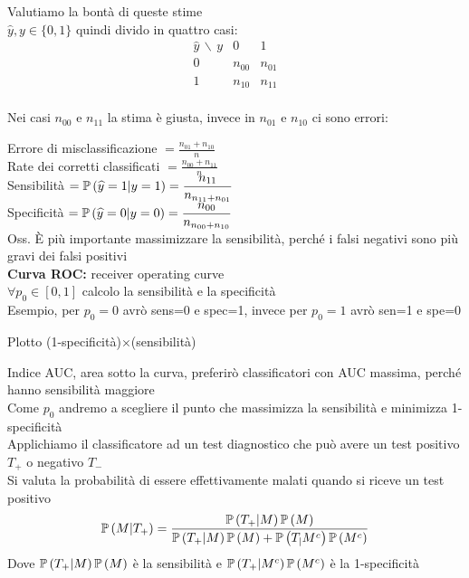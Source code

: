 Valutiamo la bontà di queste stime\\

$\hat{y},y \in \{0,1\}$ quindi divido in quattro casi: 
\[
\begin{array}{c|c|c}
   \hat{y} \,\backslash\, y  & 0 & 1\\
   \hline
   0  & n_{00} & n_{01} \\
   \hline
   1 & n_{10} & n_{11} \\
\end{array}
\]

Nei casi $n_{00}$ e $n_{11}$ la stima è giusta, invece in $n_{01}$ e $n_{10}$ ci sono errori:

Errore di misclassificazione $=\frac{n_{01}+n_{10}}{n}$\skipp\\
Rate dei corretti classificati $=\frac{n_{00}+n_{11}}{n}$\\


Sensibilità $=\mathbb{P} \left( \widehat{y}=1 | y=1 \right) = \dfrac{n_{11}}{n_{n_{11}+n_{01}}}$\skipp\\
Specificità $=\mathbb{P} \left( \widehat{y}=0 | y=0 \right) = \dfrac{n_{00}}{n_{n_{00}+n_{10}}}$\\


Oss. È più importante massimizzare la sensibilità, perché i falsi negativi sono più gravi dei falsi positivi\\

\textbf{Curva ROC:} receiver operating curve\\
$\forall p_0\in [0,1]$ calcolo la sensibilità e la specificità\\

Esempio, per $p_0=0$ avrò sens=0 e spec=1, invece per $p_0=1$ avrò  sen=1 e spe=0

Plotto (1-specificità)$\times$(sensibilità)


Indice AUC, area sotto la curva, preferirò classificatori con AUC massima, perché hanno sensibilità maggiore\\

Come $p_0$ andremo a scegliere il punto che massimizza la sensibilità e minimizza 1-specificità\\

Applichiamo il classificatore ad un test diagnostico che può avere un test positivo $T_+$ o negativo $T_-$\\
Si valuta la probabilità di essere effettivamente malati quando si riceve un test positivo
\[
\mathbb{P} \left( M|T_+ \right) = \dfrac{\mathbb{P} \left( T_+|M \right)\mathbb{P} \left( M \right)}{\mathbb{P} \left( T_+|M \right)\mathbb{P} \left( M \right) + \mathbb{P} \left( T_|M^c \right)\mathbb{P} \left( M^c \right)}
\]
Dove $\mathbb{P} \left( T_+|M \right)\mathbb{P} \left( M \right)$ è la sensibilità e $\mathbb{P} \left( T_+|M^c \right)\mathbb{P} \left( M^c \right)$ è la 1-specificità\\

